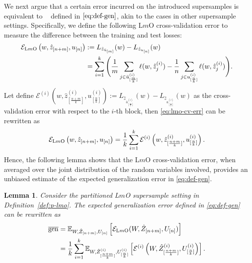 \documentclass[onecolumn,romanappendices,10pt]{IEEEtran}
\newtheorem{lemma}{Lemma}
\newcommand{\Ecal}{{\mathcal E}}
\newcommand{\EE}{{\mathbb{E}}}
\DeclareMathOperator{\gen}{\overline{gen}}
\begin{document}
	We next argue that a certain error incurred on the introduced supersamples is equivalent to $\gen$ defined in $\eqref{eq:def-gen}$, akin to the cases in other supersample settings. Specifically, we define the following L$m$O cross-validation error to measure the difference between the training and test losses:
	\begin{equation}
		\begin{aligned}
			\Ecal_{\textnormal{L$m$O}} \left( w, \hat{z}_{[n+m]}, u_{[n]} \right) &:= L_{\hat{z}_{\bar{u}_{[m]}}}(w) - L_{\hat{z}_{u_{[n]}}}(w) \\
			&= \sum_{i=1}^{k} \Bigg( \frac{1}{m} \sum_{j \in \bar{u}^{(i)}_{[\frac{m}{k}]}} \ell(w, \hat{z}^{(i)}_j) - \frac{1}{n} \sum_{j \in u^{(i)}_{[\frac{n}{k}]}} \ell(w, \hat{z}^{(i)}_j) \Bigg).
		\end{aligned}\label{eq:lmo-cv-err}
	\end{equation}
	Let define $\Ecal^{(i)}\left( w, \hat{z}^{(i)}_{[\frac{n+m}{k}]}, u^{(i)}_{[\frac{n}{k}]} \right) := L_{\hat{z}_{\bar{u}^{(i)}_{[\frac{m}{k}]}}}(w) - L_{\hat{z}_{u^{(i)}_{[\frac{n}{k}]}}}(w)$ as the cross-validation error with respect to the $i$-th block, then \eqref{eq:lmo-cv-err} can be rewritten as
	\begin{equation}
		\begin{aligned}
			\Ecal_{\textnormal{L$m$O}} \left( w, \hat{z}_{[n+m]}, u_{[n]} \right) = \frac{1}{k} \sum_{i=1}^{k} \Ecal^{(i)}\left( w, \hat{z}^{(i)}_{[\frac{n+m}{k}]}, u^{(i)}_{[\frac{n}{k}]} \right).
		\end{aligned}
	\end{equation}
	Hence, the following lemma shows that the L$m$O cross-validation error, when averaged over the joint distribution of the random variables involved, provides an unbiased estimate of the expected generalization error in \eqref{eq:def-gen}.
	\begin{lemma} \label{lem:IP-lmo-gen-err}
		Consider the partitioned L$m$O supersample setting in Definition~\ref{def:p-lmo}. The expected generalization error defined in \eqref{eq:def-gen} can be rewritten as
		\begin{equation}
			\begin{aligned}
				\gen &= \EE_{W, \hat{Z}_{[n+m]}, U_{[n]}} \left[ \Ecal_{\textnormal{L$m$O}}( W, \hat{Z}_{[n+m]}, U_{[n]} ) \right] \\
				&= \frac{1}{k} \sum_{i=1}^{k} \EE_{W, \hat{Z}^{(i)}_{[\frac{n+m}{k}]}, U^{(i)}_{[\frac{n}{k}]}} \left[ \Ecal^{(i)}\left( W, \hat{Z}^{(i)}_{[\frac{n+m}{k}]}, U^{(i)}_{[\frac{n}{k}]} \right) \right].
			\end{aligned}\label{eq:IP-lmo-gen-err}
		\end{equation}
	\end{lemma}
	
\end{document}
